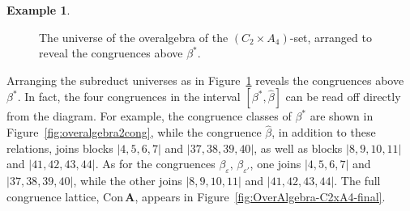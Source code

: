 \documentclass[cm,dissertation]{uhthesis}
\theoremstyle{plain}
\theoremstyle{definition}
\newtheorem{example}[theorem]{Example}
\theoremstyle{remark}
\numberwithin{theorem}{section}
\numberwithin{claim}{chapter}
\numberwithin{equation}{section}
\numberwithin{conjecture}{chapter}
\newcommand{\<}{\ensuremath{\langle}}
\renewcommand{\>}{\ensuremath{\rangle}}
\newcommand{\Con}{\ensuremath{\mathrm{Con\,}}}
\newcommand{\0}{\ensuremath{\mathbf{0}}}
\newcommand{\1}{\ensuremath{\mathbf{1}}}
\newcommand{\2}{\ensuremath{\mathbf{2}}}
\newcommand{\3}{\ensuremath{\mathbf{3}}}
\newcommand{\4}{\ensuremath{\mathbf{4}}}
\newcommand{\5}{\ensuremath{\mathbf{5}}}
\newcommand{\bA}{\ensuremath{\mathbf{A}}}
\newcommand{\eps}{\ensuremath{\varepsilon}}
\begin{document}
\begin{example}
\begin{figure}[h!]
{
        }
        \caption{The universe of the overalgebra of the $(C_2\times A_4)$-set,
          arranged to reveal the congruences above $\beta^*$.}
        \label{fig:overalgebra2}
  \end{figure}

  Arranging the subreduct universes as in Figure~\ref{fig:overalgebra2}
  reveals the congruences above $\beta^*$.  
  In fact, the four congruences in the interval $[\beta^*, \widehat{\beta}]$ can be read off
  directly from the diagram.   For example, the congruence classes of $\beta^*$
  are shown in Figure~\ref{fig:overalgebra2cong}, while 
  the congruence $\widehat{\beta}$, in addition to these relations, joins blocks 
  $|4, 5, 6, 7|$ and $|37, 38, 39, 40|$, 
  as well as blocks $|8,9,10,11|$ and $|41,42,43,44|$.
  As for the congruences $\beta_\eps, \, \beta_{\eps'}$, one joins
  $|4, 5, 6, 7|$ and $|37, 38, 39, 40|$, while the other joins
  $|8,9,10,11|$ and $|41,42,43,44|$.  The full congruence lattice, $\Con \bA$,
  appears in Figure~\ref{fig:OverAlgebra-C2xA4-final}.



\end{example}
\end{document}
